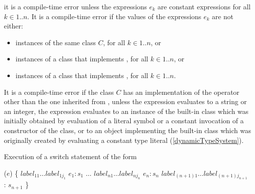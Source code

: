 \documentclass[makeidx]{article}
\begin{document}
{it is a compile-time error unless the expressions $e_k$ are constant expressions for all $k \in 1 .. n$.
It is a compile-time error if the values of the expressions $e_k$ are not either:
\begin{itemize}
\item instances of the same class $C$, for all $k \in 1 .. n$, or
\item instances of a class that implements , for all $k \in 1 .. n$, or
\item instances of a class that implements , for all $k \in 1 .. n$.
\end{itemize}


\LMHash{}%
It is a compile-time error if the class $C$ has an implementation of
the operator \code{==} other than the one inherited from ,
unless the expression evaluates to a string or an integer,
the expression evaluates to an instance of the built-in
class  which was initially obtained by evaluation of a
literal symbol or
a constant invocation of a constructor of the  class,
or to an object implementing the built-in class 
which was originally created by evaluating a constant type literal
(\ref{dynamicTypeSystem}).



\LMHash{}%
Execution of a switch statement of the form

\begin{dartCode}
\SWITCH{} ($e$) \{
   $label_{11} \ldots label_{1j_1}$ \CASE{} $e_1: s_1$
   $\ldots$
   $label_{n1} \ldots label_{nj_n}$ \CASE{} $e_n: s_n$
   $label_{(n+1)1} \ldots label_{(n+1)j_{n+1}}$ \DEFAULT{}: $s_{n+1}$
\}
\end{dartCode}

}
\end{document}
